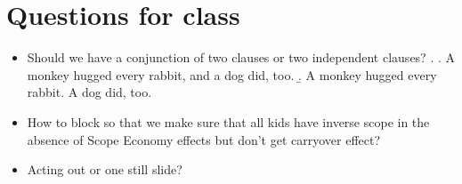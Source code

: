 \documentclass[11pt]{article}
\begin{document}
\section{Questions for class}

\begin{itemize}
  \item Should we have a conjunction of two clauses or two independent clauses?
    \ex. \a. A monkey hugged every rabbit, and a dog did, too.
    \b. A monkey hugged every rabbit. A dog did, too.

  \item How to block so that we make sure that all kids have inverse scope in the absence of Scope Economy effects but don't get carryover effect?
  \item Acting out or one still slide?
\end{itemize}

\end{document}
